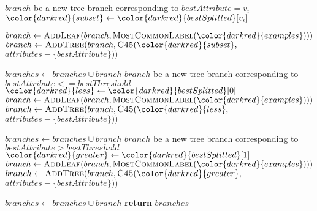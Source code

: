     \begin{algorithm}
    \begin{algorithmic} [1]

           $branch$ {\small be a new tree branch corresponding to} $bestAttribute = v_i$
          \State ${\color{darkred}{subset}} \gets {\color{darkred}{bestSplitted}}[v_i]$

              \State $branch \gets \textsc{AddLeaf}(branch, \textsc{MostCommonLabel}({\color{darkred}{examples}})))$
          \Else
              \State $branch \gets \textsc{AddTree}(branch, \textsc{C45}({\color{darkred}{subset}},$ $attributes - \{bestAttribute\}))$\par\hfill
          \EndIf
          \State $branches \gets branches \cup branch$
      \EndFor
    \Else
       $branch$ {\small be a new tree branch corresponding to} $bestAttribute <= bestThreshold$
      \State ${\color{darkred}{less}} \gets {\color{darkred}{bestSplitted}}[0]$
          \State $branch \gets \textsc{AddLeaf}(branch, \textsc{MostCommonLabel}({\color{darkred}{examples}})))$
      \Else
          \State $branch \gets \textsc{AddTree}(branch, \textsc{C45}({\color{darkred}{less}},$ $attributes - \{bestAttribute\}))$\par\hfill
      \EndIf
      \State $branches \gets branches \cup branch$
       $branch$ {\small be a new tree branch corresponding to} $bestAttribute > bestThreshold$
      \State ${\color{darkred}{greater}} \gets {\color{darkred}{bestSplitted}}[1]$
          \State $branch \gets \textsc{AddLeaf}(branch, \textsc{MostCommonLabel}({\color{darkred}{examples}})))$
      \Else
          \State $branch \gets \textsc{AddTree}(branch, \textsc{C45}({\color{darkred}{greater}},$ $attributes - \{bestAttribute\}))$\par\hfill
      \EndIf
      \State $branches \gets branches \cup branch$
    \EndIf
    \State \textbf{return} $branches$
\EndProcedure
\end{algorithmic}
\end{algorithm}

